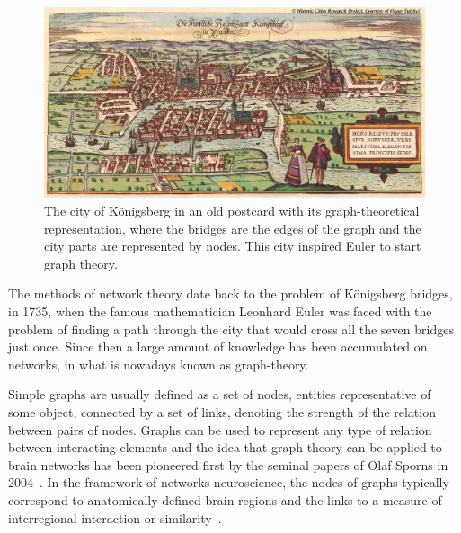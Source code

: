\noindent\begin{figure}[htb]
\centering
\begin{minipage}[b]{0.5\textwidth}
\includegraphics[width=1\linewidth]{images/konigsberg.jpg}
\end{minipage}\begin{minipage}[b]{0.5\textwidth}
\centering
{}
\end{minipage}
\caption*{\textsf{The city of K{\"o}nigsberg in an old postcard with its graph-theoretical representation, where the bridges are the edges of the graph and the city parts are represented by nodes. This city inspired Euler to start graph theory.}}
\end{figure}

The methods of network theory date back to the problem of K{\"o}nigsberg bridges, in 1735, when the famous mathematician Leonhard Euler was faced with the problem of finding a path through the city that would cross all the seven bridges just once.
Since then a large amount of knowledge has been accumulated on networks, in what is nowadays known as graph-theory.

Simple graphs are usually defined as a set of nodes, entities representative of some object, connected by a set of links, denoting the strength of the relation between pairs of nodes.
Graphs can be used to represent any type of relation between interacting elements and the idea that graph-theory can be applied to brain networks has been pioneered first by the seminal papers of Olaf Sporns in 2004~\cite{Sporns2004}. In the framework of networks neuroscience, the nodes of graphs typically correspond to anatomically defined brain regions and the links to a measure of interregional interaction or similarity~\cite{bullmore2009}.

